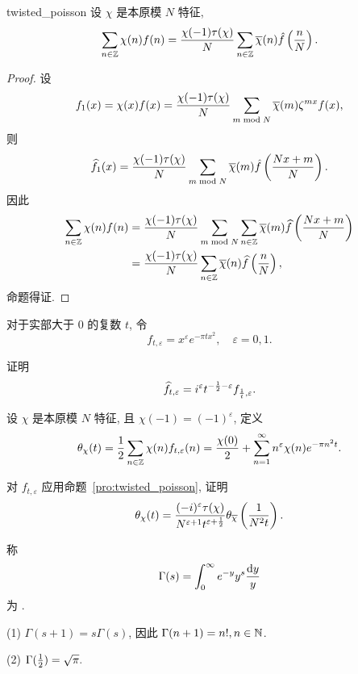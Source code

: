 \begin{proposition}{}{twisted_poisson}
设 $\chi$ 是本原模 $N$ 特征,
  \[\sum_{n\in{\mathbb{Z}}}\chi(n)f(n)=\frac{\chi(-1)\tau(\chi)}{N}\sum_{n\in{\mathbb{Z}}}\overline\chi(n)\hat f\left(\frac{n}{N}\right).\]
\end{proposition}
\begin{proof}
设
  \[f_1(x)=\chi(x)f(x)=\frac{\chi(-1)\tau(\chi)}{N}\sum_{m\bmod N}\overline\chi(m)\zeta^{mx}f(x),\]
则
  \[\widehat f_1(x)=\frac{\chi(-1)\tau(\chi)}{N}\sum_{m\bmod N}\overline\chi(m)\hat f\left(\frac{Nx+m}{N}\right).\]
因此
  \[\begin{split}
    \sum_{n\in{\mathbb{Z}}} \chi(n)f(n)
      &=\frac{\chi(-1)\tau(\chi)}{N}\sum_{m\bmod N}\sum_{n\in{\mathbb{Z}}}\overline\chi(m)\widehat f\left(\frac{Nx+m}{N}\right)\\
      &=\frac{\chi(-1)\tau(\chi)}{N}\sum_{n\in{\mathbb{Z}}}\overline\chi(n)\widehat f\left(\frac{n}{N}\right),
  \end{split}\]
命题得证.
\end{proof}


对于实部大于 $0$ 的复数 $t$, 令
  \[f_{t,\varepsilon}=x^\varepsilon e^{-\pi tx^2},\quad \varepsilon=0,1.\]

\begin{exercise}
证明
  \[\widehat f_{t,\varepsilon}=i^\varepsilon t^{-\frac{1}{2}-\varepsilon}f_{\frac{1}{t},\varepsilon}.\] 
\end{exercise}

设 $\chi$  是本原模 $N$ 特征, 且 $\chi(-1)=(-1)^\varepsilon$, 定义 
  \[\theta_\chi(t)=\frac{1}{2}\sum_{n\in{\mathbb{Z}}} \chi(n)f_{t,\varepsilon}(n)=\frac{\chi(0)}{2}+
\sum_{n=1}^\infty n^{\varepsilon}\chi(n)e^{-\pi n^2t}.\]

\begin{exercise}
对 $f_{t,\varepsilon}$ 应用命题~\ref{pro:twisted_poisson}, 证明
  \[ \theta_\chi(t)=\frac{(-i)^\varepsilon\tau(\chi)}{N^{\varepsilon+1}t^{\varepsilon+\frac{1}{2}}}\theta_{\overline\chi}\left(\frac{1}{N^2t}\right).\]
\end{exercise}

称
  \[\Gamma(s)=\int_0^\infty e^{-y}y^s\frac{\mathop{}\!\mathrm{d} y}{y}\]
为 .

\begin{exercise}
(1) $\Gamma(s+1)=s\Gamma(s)$, 因此 $\Gamma(n+1)=n!,n\in{\mathbb{N}}$.

(2) $\Gamma(\frac{1}{2})=\sqrt{\pi}.$
\end{exercise}

